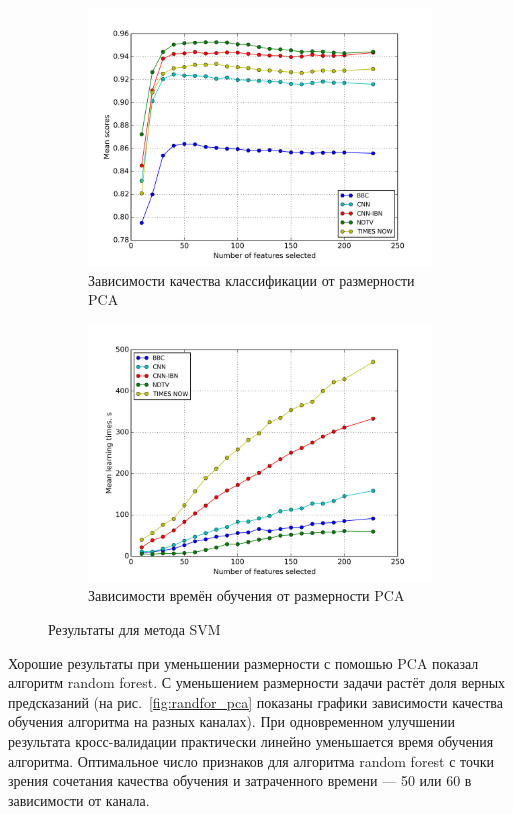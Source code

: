 \begin{figure}[h!]
    \centering
	\begin{subfigure}{0.45\textwidth}
		\includegraphics[width=\textwidth]{images/PCA-SVM.png}
		\caption{Зависимости качества классификации от размерности PCA}
	\end{subfigure}
	\begin{subfigure}{0.45\textwidth}
		\includegraphics[width=\textwidth]{images/PCA-SVMTime.png}
		\caption{Зависимости времён обучения от размерности PCA}
	\end{subfigure}
	\caption{Результаты для метода SVM}\label{fig:svm_pca}
\end{figure}

\par
 Хорошие результаты при уменьшении размерности с помошью PCA показал алгоритм random forest. С уменьшением размерности задачи растёт доля верных предсказаний (на рис.~\ref{fig:randfor_pca} показаны графики 
 зависимости качества обучения алгоритма на разных каналах).
 При одновременном улучшении результата кросс-валидации практически линейно уменьшается время обучения алгоритма. Оптимальное число признаков для алгоритма random forest с точки зрения сочетания качества обучения и затраченного времени --- 50 или 60 в зависимости от канала.
 
